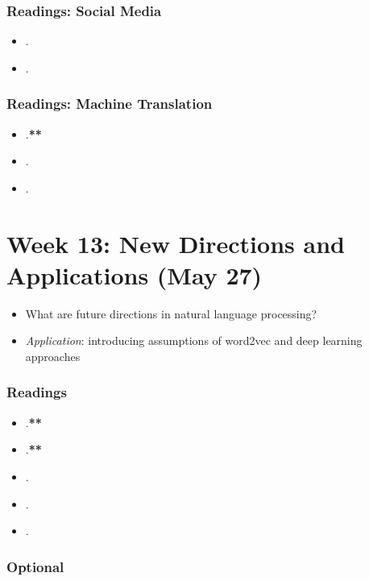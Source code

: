 \documentclass[abstract=on,parskip=full,headings=standardclasses,fontsize=11pt,paper=a4]{scrartcl}
\begin{document}
\subsubsection*{Readings: Social Media}
\begin{itemize}
\item {}.
\item {}.
\end{itemize}

\subsubsection*{Readings: Machine Translation}
\begin{itemize}
\item {}.\textbf{**}
\item {}.
\item {}.
\end{itemize}


\section{Week 13: New Directions and Applications (May 27)}


\begin{itemize}
\renewcommand\labelitemi{--}
\item What are future directions in natural language processing?
\item \textit{Application}: introducing assumptions of word2vec and deep learning approaches
\end{itemize}

\subsubsection*{Readings}
\begin{itemize}
\item {}.\textbf{**}
\item {}.\textbf{**}
\item {}.
\item {}.
\item {}.
\end{itemize}

\subsubsection*{Optional}
\end{document}
